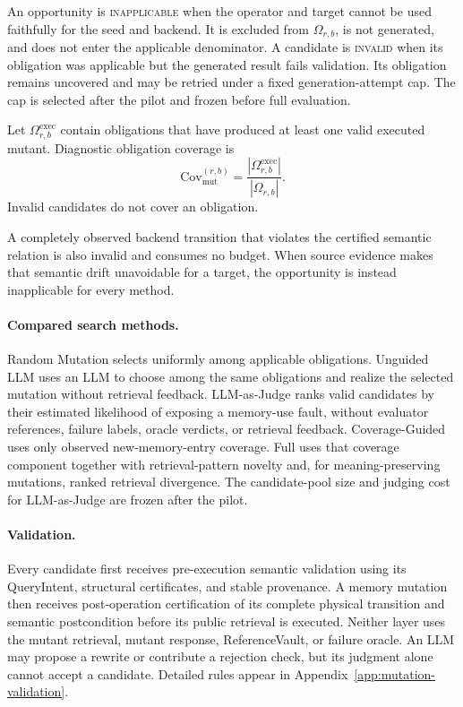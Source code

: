 An opportunity is \textsc{inapplicable} when the operator and target cannot
be used faithfully for the seed and backend. It is excluded from
\(\Omega_{r,b}\), is not generated, and does not enter the applicable
denominator. A candidate is \textsc{invalid} when its obligation was
applicable but the generated result fails validation. Its obligation remains
uncovered and may be retried under a fixed generation-attempt cap. The cap is
selected after the pilot and frozen before full evaluation.

Let \(\Omega_{r,b}^{\mathrm{exec}}\) contain obligations that have produced at
least one valid executed mutant. Diagnostic obligation coverage is
\begin{equation}
\mathrm{Cov}_{\mathrm{mut}}^{(r,b)}=
\frac{|\Omega_{r,b}^{\mathrm{exec}}|}{|\Omega_{r,b}|}.
\label{eq:mutation-coverage}
\end{equation}
Invalid candidates do not cover an obligation.

A completely observed backend transition that violates the certified semantic
relation is also invalid and consumes no budget. When source evidence makes
that semantic drift unavoidable for a target, the opportunity is instead
inapplicable for every method.

\paragraph{Compared search methods.}
Random Mutation selects uniformly among applicable obligations. Unguided LLM
uses an LLM to choose among the same obligations and realize the selected
mutation without retrieval feedback. LLM-as-Judge ranks valid candidates by
their estimated likelihood of exposing a memory-use fault, without evaluator
references, failure labels, oracle verdicts, or retrieval feedback.
Coverage-Guided uses only observed new-memory-entry coverage. Full \system
uses that coverage component together with retrieval-pattern novelty and, for
meaning-preserving mutations, ranked retrieval divergence. The candidate-pool
size and judging cost for LLM-as-Judge are frozen after the pilot.

\paragraph{Validation.}
Every candidate first receives pre-execution semantic validation using its
QueryIntent, structural certificates, and stable provenance. A memory mutation
then receives post-operation certification of its complete physical transition
and semantic postcondition before its public retrieval is executed. Neither
layer uses the mutant retrieval, mutant response, ReferenceVault, or failure
oracle. An LLM may propose a rewrite or contribute a rejection check, but its
judgment alone cannot accept a candidate. Detailed rules appear in
Appendix~\ref{app:mutation-validation}.

